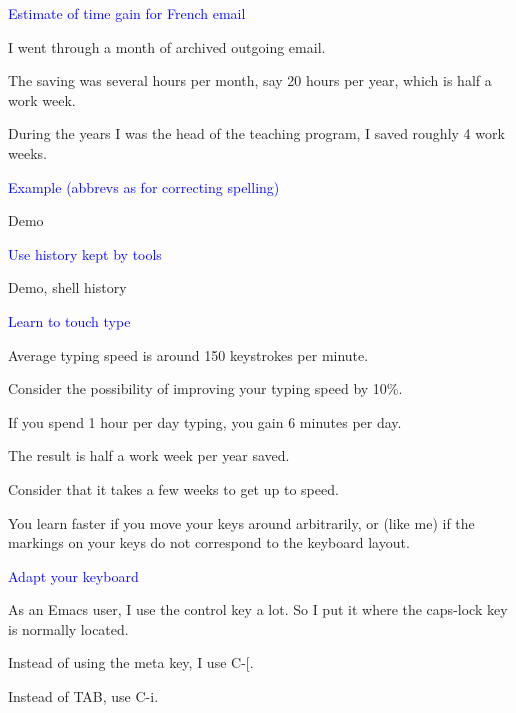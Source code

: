 \documentclass{slides}
\newcommand{\ti}[1]{\begin{center}\Large{\textcolor{blue}{#1}}\end{center}}
\begin{document}
\begin{slide}\ti{Estimate of time gain for French email}

I went through a month of archived outgoing email.

The saving was several hours per month, say 20 hours per year, which
is half a work week.

During the years I was the head of the teaching program, I saved
roughly 4 work weeks.

\vfill\end{slide}
\begin{slide}\ti{Example (abbrevs as for correcting spelling)}

Demo

\vfill\end{slide}
\begin{slide}\ti{Use history kept by tools}

Demo, shell history

\vfill\end{slide}
\begin{slide}\ti{Learn to touch type}

Average typing speed is around 150 keystrokes per minute.

Consider the possibility of improving your typing speed by 10\%. 

If you spend 1 hour per day typing, you gain 6 minutes per day.

The result is half a work week per year saved.

Consider that it takes a few weeks to get up to speed.

You learn faster if you move your keys around arbitrarily, or (like
me) if the markings on your keys do not correspond to the keyboard
layout.

\vfill\end{slide}
\begin{slide}\ti{Adapt your keyboard}

As an Emacs user, I use the control key a lot.  So I put it where the
caps-lock key is normally located.  

Instead of using the meta key, I use C-[.

Instead of TAB, use C-i.

\vfill\end{slide}
\end{document}
